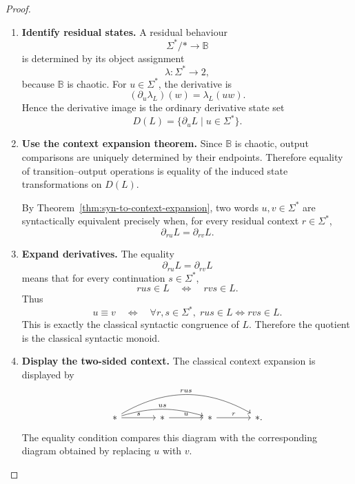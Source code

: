 \begin{proof}
    \leavevmode
    \begin{enumerate}
        \item \textbf{Identify residual states.}
        A residual behaviour
        \[
            \Sigma^\ast/{*}\to\mathbb B
        \]
        is determined by its object assignment
        \[
            \lambda:\Sigma^\ast\to 2,
        \]
        because \(\mathbb B\) is chaotic. For \(u\in\Sigma^\ast\), the
        derivative is
        \[
            (\partial_u\lambda_L)(w)=\lambda_L(uw).
        \]
        Hence the derivative image is the ordinary derivative state set
        \[
            D(L)=\{\partial_uL\mid u\in\Sigma^\ast\}.
        \]

        \item \textbf{Use the context expansion theorem.}
        Since \(\mathbb B\) is chaotic, output comparisons are uniquely
        determined by their endpoints. Therefore equality of
        transition--output operations is equality of the induced state
        transformations on \(D(L)\).

        By Theorem~\ref{thm:syn-to-context-expansion}, two words
        \(u,v\in\Sigma^\ast\) are syntactically equivalent precisely when, for
        every residual context \(r\in\Sigma^\ast\),
        \[
            \partial_{ru}L=\partial_{rv}L.
        \]

        \item \textbf{Expand derivatives.}
        The equality
        \[
            \partial_{ru}L=\partial_{rv}L
        \]
        means that for every continuation \(s\in\Sigma^\ast\),
        \[
            rus\in L
            \quad\Longleftrightarrow\quad
            rvs\in L.
        \]
        Thus
        \[
            u\equiv v
            \quad\Longleftrightarrow\quad
            \forall r,s\in\Sigma^\ast,\;
            rus\in L\Longleftrightarrow rvs\in L.
        \]
        This is exactly the classical syntactic congruence of \(L\). Therefore
        the quotient is the classical syntactic monoid.

        \item \textbf{Display the two-sided context.}
        The classical context expansion is displayed by
        \[
        \begin{tikzcd}[column sep=large, row sep=large]
            *
                \arrow[r, "s"]
                \arrow[rr, "us", bend left=16]
                \arrow[rrr, "rus", bend left=30]
            &
            *
                \arrow[r, "u"]
            &
            *
                \arrow[r, "r"]
            &
            * .
        \end{tikzcd}
        \]
        The equality condition compares this diagram with the corresponding
        diagram obtained by replacing \(u\) with \(v\).
    \end{enumerate}
\end{proof}

